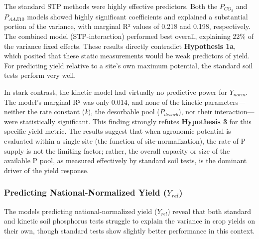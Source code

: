 \documentclass[
  a4paper,
]{article}
\begin{document}
The standard STP methods were highly effective predictors. Both the
\(P_{CO_2}\) and \(P_{AAE10}\) models showed highly significant
coefficients and explained a substantial portion of the variance, with
marginal R² values of 0.218 and 0.198, respectively. The combined model
(STP-interaction) performed best overall, explaining 22\% of the
variance fixed effects. These results directly contradict
\textbf{Hypothesis 1a}, which posited that these static measurements
would be weak predictors of yield. For predicting yield relative to a
site's own maximum potential, the standard soil tests perform very well.

In stark contrast, the kinetic model had virtually no predictive power
for \(Y_{norm}\). The model's marginal R² was only 0.014, and none of
the kinetic parameters---neither the rate constant (\emph{k}), the
desorbable pool (\(P_{desorb}\)), nor their interaction---were
statistically significant. This finding strongly refutes
\textbf{Hypothesis 3} for this specific yield metric. The results
suggest that when agronomic potential is evaluated within a single site
(the function of site-normalization), the rate of P supply is not the
limiting factor; rather, the overall capacity or size of the available P
pool, as measured effectively by standard soil tests, is the dominant
driver of the yield response.

\subsubsection{\texorpdfstring{Predicting National-Normalized Yield
(\(Y_{rel}\))}{Predicting National-Normalized Yield (Y\_\{rel\})}}\label{predicting-national-normalized-yield-y_rel}

The models predicting national-normalized yield (\(Y_{rel}\)) reveal
that both standard and kinetic soil phosphorus tests struggle to explain
the variance in crop yields on their own, though standard tests show
slightly better performance in this context.
\end{document}
